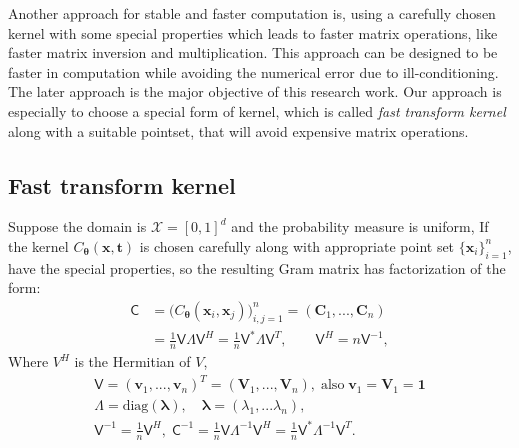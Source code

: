 \documentclass[twocolumn]{svjour3}          %
\newcommand{\bm}[1]{\boldsymbol{#1}}
\newcommand{\vlambda}{{\bm{\lambda}}}
\newcommand{\vtheta}{{\bm{\theta}}}
\newcommand{\vC}{\bm{C}}
\newcommand{\vt}{\bm{t}}
\newcommand{\vv}{\bm{v}}
\newcommand{\vV}{\bm{V}}
\newcommand{\vx}{\bm{x}}
\newcommand{\vone}{\bm{1}}
\newcommand{\mC}{\mathsf{C}}
\newcommand{\mCInv}{{\mathsf{C}^{-1}}}
\newcommand{\mLambda}{\mathsf{\Lambda}}
\newcommand{\mV}{\mathsf{V}}
\newcommand{\diag}{\text{diag}}
\begin{document}
Another approach for stable and faster computation is, using a carefully chosen kernel with some special properties which leads to faster matrix operations, like faster matrix inversion and multiplication. 
This approach can be designed to be faster in computation while avoiding the numerical error due to ill-conditioning. 
The later approach is the major objective of this research work. 
Our approach is especially to choose a special form of kernel, which is called \emph{fast transform kernel} along with a suitable pointset, that will avoid expensive matrix operations.






\subsection{Fast transform kernel}
Suppose the domain is $\mathcal{X} = [0,1]^d$ and the probability measure is uniform, If the kernel $C_\vtheta(\vx,\vt)$ is chosen carefully along with appropriate point set $\{\vx_i\}_{i=1}^n$, have the special properties, so the resulting Gram matrix has factorization of the form:
\begin{align}
\nonumber
\mC &= \Big(C_\vtheta(\vx_i,\vx_j)\Big)_{i,j=1}^n  = (\vC_1,...,\vC_n) 
\\
\label{eqn:ftk_factor}
&= \frac 1n \mV \mLambda \mV^H  = \frac 1n \mV^* \mLambda \mV^T , 
\quad \quad \mV^H = n \mV^{-1},
\end{align}
Where $V^H$ is the Hermitian of $V$,
\begin{gather*}
\mV = (\vv_1,...,\vv_n)^T = (\vV_1,...,\vV_n), \; \text{also} \;  \vv_1 = \vV_1 = \vone
\\
\mLambda = \diag(\vlambda), \quad 
\vlambda = (\lambda_1, ... \lambda_n),
\\
\mV^{-1} = \frac 1n \mV^H, \;
\mCInv  = \frac 1n \mV \mLambda^{-1} \mV^H
 = \frac 1n \mV^* \mLambda^{-1} \mV^T
.
\end{gather*}
\end{document}
